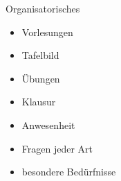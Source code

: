 \begin{frame}
	\titlepage
\end{frame}


\begin{frame}{Organisatorisches}
	\begin{itemize}
		\item Vorlesungen
		\item Tafelbild
		\item Übungen
		\item Klausur
		\item Anwesenheit
		\item Fragen jeder Art
		\item besondere Bedürfnisse
	\end{itemize}
\end{frame}

\AtBeginSection{
	\begin{frame}
		\sectionpage
		\tableofcontents[sectionstyle=hide/hide,subsectionstyle=show/show/hide]
	\end{frame}
}

